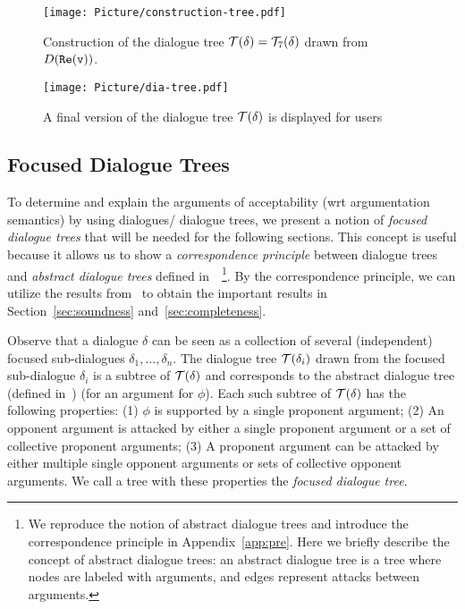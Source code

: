 \begin{figure}  \vspace{-8mm}
\centering   
\texttt{[image: Picture/construction-tree.pdf]}
\caption{Construction of the dialogue tree $\mathcal{T}(\delta) = \mathcal{T}_{7}(\delta)$ drawn from $D(\texttt{\textup{Re}}(\texttt{\textup{v}}))$.}
\label{fig:construct-tree}
\end{figure}

\begin{figure}  \vspace{-8mm}
\centering   
\texttt{[image: Picture/dia-tree.pdf]}
\caption{A final version of the dialogue tree $\mathcal{T}(\delta)$ is displayed for users}
\label{fig:tree-user}
\end{figure}


\subsection{Focused Dialogue Trees}

To determine and explain the arguments of acceptability (wrt argumentation semantics) by using dialogues/ dialogue trees, we present a notion of \emph{focused dialogue trees} that will be needed for the following sections. 
This concept is useful because it allows us to show a \emph{correspondence principle} between dialogue trees and \emph{abstract dialogue trees} defined in~\cite{loanho_2024}~\footnote{
%
We reproduce the notion of abstract dialogue trees and introduce the correspondence principle in Appendix~\ref{app:pre}.
Here we briefly describe the concept of abstract dialogue trees: an abstract dialogue tree is a tree where nodes are labeled with arguments, and edges represent attacks between arguments. }.
By the correspondence principle, we can utilize the results from~\cite{loanho_2024} to obtain the important results in Section~\ref{sec:soundness} and~\ref{sec:completeness}.


Observe that a dialogue $\delta$ can be seen as a collection of several (independent) focused sub-dialogues $\delta_1, \ldots, \delta_n$. The dialogue tree $\mathcal{T}(\delta_i)$ drawn from the focused sub-dialogue $\delta_i$ is a subtree of $\mathcal{T}(\delta)$ and corresponds to the abstract dialogue tree (defined in~\cite{loanho_2024}) (for an argument for $\phi$). Each such subtree of $\mathcal{T}(\delta)$ has the following properties: (1) $\phi$ is supported by a single proponent argument; (2) An opponent argument is attacked by either a single proponent argument or a set of collective proponent arguments; (3) A proponent argument can be attacked by either multiple single opponent arguments or sets of collective opponent arguments. We call a tree with these properties the \emph{focused dialogue tree}.


